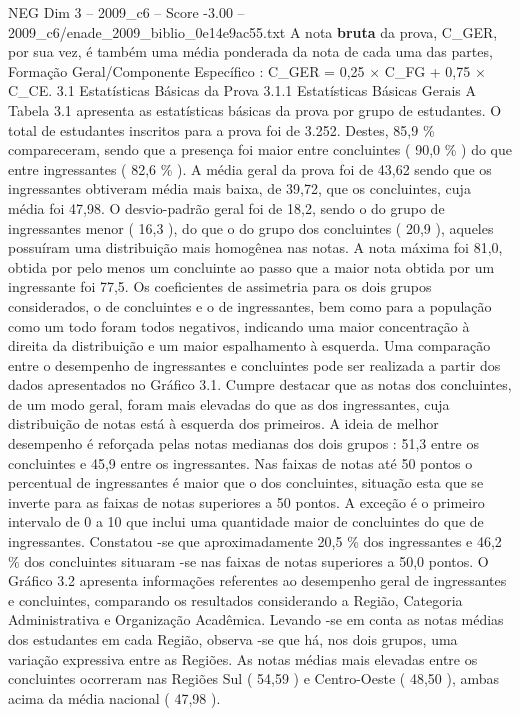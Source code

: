 \begin{textsample}{NEG Dim 3 – 2009\_c6 – Score -3.00 – 2009\_c6/enade\_2009\_biblio\_0e14e9ac55.txt}
A nota \textbf{bruta} da prova, C\_GER, por sua vez, é também uma média ponderada da nota de cada uma das partes, Formação Geral/Componente Específico : C\_GER = 0,25 × C\_FG + 0,75 × C\_CE. 3.1 Estatísticas Básicas da Prova 3.1.1 Estatísticas Básicas Gerais A Tabela 3.1 apresenta as estatísticas básicas da prova por grupo de estudantes.
O total de estudantes inscritos para a prova foi de 3.252.
Destes, 85,9 \% compareceram, sendo que a presença foi maior entre concluintes ( 90,0 \% ) do que entre ingressantes ( 82,6 \% ).
A média geral da prova foi de 43,62 sendo que os ingressantes obtiveram média mais baixa, de 39,72, que os concluintes, cuja média foi 47,98.
O desvio-padrão geral foi de 18,2, sendo o do grupo de ingressantes menor ( 16,3 ), do que o do grupo dos concluintes ( 20,9 ), aqueles possuíram uma distribuição mais homogênea nas notas.
A nota máxima foi 81,0, obtida por pelo menos um concluinte ao passo que a maior nota obtida por um ingressante foi 77,5.
Os coeficientes de assimetria para os dois grupos considerados, o de concluintes e o de ingressantes, bem como para a população como um todo foram todos negativos, indicando uma maior concentração à direita da distribuição e um maior espalhamento à esquerda.
Uma comparação entre o desempenho de ingressantes e concluintes pode ser realizada a partir dos dados apresentados no Gráfico 3.1.
Cumpre destacar que as notas dos concluintes, de um modo geral, foram mais elevadas do que as dos ingressantes, cuja distribuição de notas está à esquerda dos primeiros.
A ideia de melhor desempenho é reforçada pelas notas medianas dos dois grupos : 51,3 entre os concluintes e 45,9 entre os ingressantes.
Nas faixas de notas até 50 pontos o percentual de ingressantes é maior que o dos concluintes, situação esta que se inverte para as faixas de notas superiores a 50 pontos.
A exceção é o primeiro intervalo de 0 a 10 que inclui uma quantidade maior de concluintes do que de ingressantes.
Constatou -se que aproximadamente 20,5 \% dos ingressantes e 46,2 \% dos concluintes situaram -se nas faixas de notas superiores a 50,0 pontos.
O Gráfico 3.2 apresenta informações referentes ao desempenho geral de ingressantes e concluintes, comparando os resultados considerando a Região, Categoria Administrativa e Organização Acadêmica.
Levando -se em conta as notas médias dos estudantes em cada Região, observa -se que há, nos dois grupos, uma variação expressiva entre as Regiões.
As notas médias mais elevadas entre os concluintes ocorreram nas Regiões Sul ( 54,59 ) e Centro-Oeste ( 48,50 ), ambas acima da média nacional ( 47,98 ).

\end{textsample}
